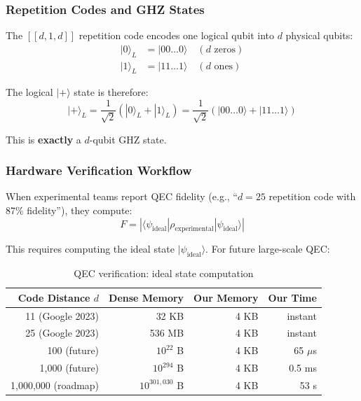 \documentclass[11pt,twocolumn]{article}
\begin{document}
\subsubsection{Repetition Codes and GHZ States}

The $[[d,1,d]]$ repetition code encodes one logical qubit into $d$ physical qubits:
\begin{align}
    |0\rangle_L &= |00\ldots0\rangle \quad (d \text{ zeros}) \\
    |1\rangle_L &= |11\ldots1\rangle \quad (d \text{ ones})
\end{align}

The logical $|+\rangle$ state is therefore:
\begin{equation}
    |+\rangle_L = \frac{1}{\sqrt{2}}\left(|0\rangle_L + |1\rangle_L\right) = \frac{1}{\sqrt{2}}\left(|00\ldots0\rangle + |11\ldots1\rangle\right)
\end{equation}

This is \textbf{exactly} a $d$-qubit GHZ state.

\subsubsection{Hardware Verification Workflow}

When experimental teams report QEC fidelity (e.g., ``$d=25$ repetition code with 87\% fidelity''), they compute:
\begin{equation}
    F = |\langle\psi_\text{ideal}|\rho_\text{experimental}|\psi_\text{ideal}\rangle|
\end{equation}

This requires computing the ideal state $|\psi_\text{ideal}\rangle$. For future large-scale QEC:

\begin{table}[H]
\centering
\caption{QEC verification: ideal state computation}
\label{tab:qec}
\begin{tabular}{@{}rrrr@{}}
\toprule
Code Distance $d$ & Dense Memory & Our Memory & Our Time \\
\midrule
11 (Google 2023) & 32 KB & 4 KB & instant \\
25 (Google 2023) & 536 MB & 4 KB & instant \\
100 (future) & $10^{22}$ B & 4 KB & 65 $\mu$s \\
1,000 (future) & $10^{294}$ B & 4 KB & 0.5 ms \\
1,000,000 (roadmap) & $10^{301,030}$ B & 4 KB & 53 s \\
\bottomrule
\end{tabular}
\end{table}
\end{document}
